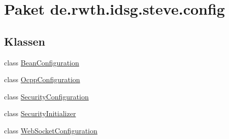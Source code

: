 \hypertarget{namespacede_1_1rwth_1_1idsg_1_1steve_1_1config}{\section{Paket de.\-rwth.\-idsg.\-steve.\-config}
\label{namespacede_1_1rwth_1_1idsg_1_1steve_1_1config}
}
\subsection*{Klassen}
\begin{DoxyCompactItemize}
\item 
class \hyperlink{classde_1_1rwth_1_1idsg_1_1steve_1_1config_1_1_bean_configuration}{Bean\-Configuration}
\item 
class \hyperlink{classde_1_1rwth_1_1idsg_1_1steve_1_1config_1_1_ocpp_configuration}{Ocpp\-Configuration}
\item 
class \hyperlink{classde_1_1rwth_1_1idsg_1_1steve_1_1config_1_1_security_configuration}{Security\-Configuration}
\item 
class \hyperlink{classde_1_1rwth_1_1idsg_1_1steve_1_1config_1_1_security_initializer}{Security\-Initializer}
\item 
class \hyperlink{classde_1_1rwth_1_1idsg_1_1steve_1_1config_1_1_web_socket_configuration}{Web\-Socket\-Configuration}
\end{DoxyCompactItemize}

